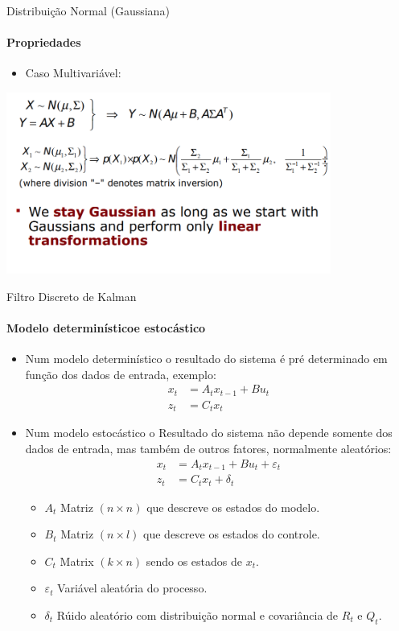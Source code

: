 \documentclass{beamer}
\begin{document}
\begin{frame}{Distribuição Normal (Gaussiana)}
    \framesubtitle{Propriedades}
    \begin{itemize}
        \item Caso Multivariável:
    \end{itemize}
    \centering
    \includegraphics[width=0.8\textwidth]{images/tmp1.png}
\end{frame}




\begin{frame}{Filtro Discreto de Kalman}
    \framesubtitle{Modelo determinísticoe estocástico}
    \begin{itemize}
        \item Num modelo determinístico o resultado do sistema é pré determinado em função dos dados de entrada, exemplo:
        \begin{align*} 
            x_t &= A_t x_{t-1} + B u_t\\ 
            z_t &= C_t x_t
        \end{align*}

        \item Num modelo estocástico o Resultado do sistema não depende somente dos dados de entrada, mas também de outros fatores, normalmente
        aleatórios:
        \begin{align} 
            x_t &= A_t x_{t-1} + B u_t +  \varepsilon_t\\ 
            z_t &= C_t x_t + \delta_t
        \end{align}

        \begin{itemize}
            \item $A_t$ Matriz $(n \times n)$ que descreve os estados do modelo.
            \item $B_t$ Matriz $(n \times l)$ que descreve os estados do controle.
            \item $C_t$ Matrix $(k\times n)$ sendo os estados de $x_t$.
            \item $ \varepsilon_t$ Variável aleatória do processo.
            \item $\delta_t$ Rúido aleatório com distribuição normal e covariância de $R_t$ e $Q_t$.
        \end{itemize}
    \end{itemize}
\end{frame}
\end{document}
